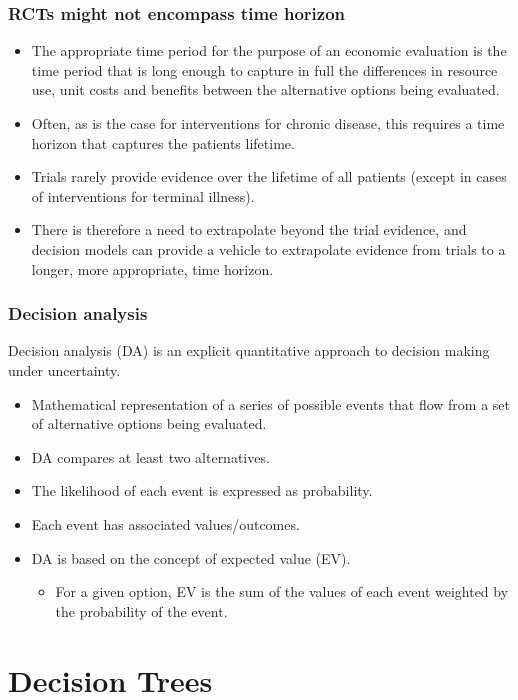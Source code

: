 \documentclass[t]{beamer}
\begin{document}
\begin{frame}
\frametitle{RCTs might not encompass time horizon}
	\begin{itemize}
		\item The appropriate time period for the purpose of an economic evaluation is the time period that is long enough to capture in full the differences in resource use, unit costs and benefits between the alternative options being evaluated.
		\item Often, as is the case for interventions for chronic disease, this requires a time horizon that captures the patients lifetime.
		\item Trials rarely provide evidence over the lifetime of all patients (except in cases of interventions for terminal illness).
		\item There is therefore a need to extrapolate beyond the trial evidence, and decision models can provide a vehicle to extrapolate evidence from trials to a longer, more appropriate, time horizon.
\end{itemize}
\end{frame}


\begin{frame}
\frametitle{Decision analysis}
Decision analysis (DA) is an \alert{explicit quantitative} approach to decision making \alert{under uncertainty}.
	\begin{itemize}
		\item Mathematical representation of a series of possible events that flow from a set of alternative options being evaluated.
		\item DA compares at least two alternatives.
		\item The likelihood of each event is expressed as probability.
		\item Each event has associated values/outcomes.
		\item DA is based on the concept of \alert{expected value (EV)}.
				\begin{itemize}
		\item For a given option, EV is the sum of the values of each event weighted by the probability of the event.
		\end{itemize}
	\end{itemize}
\end{frame}

\section{Decision Trees}
\end{document}
